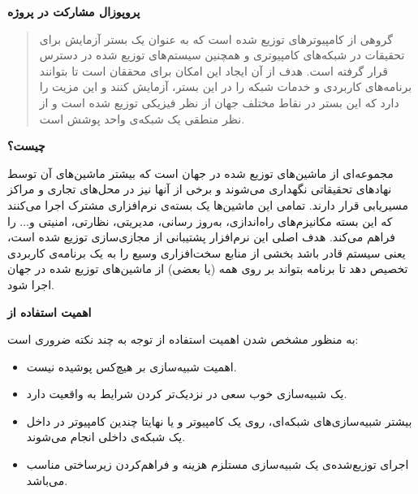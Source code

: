 \documentclass[11pt]{article}
\begin{document}
\thispagestyle{empty}

\bigskip
\bigskip

\centerline{\textbf{\Large{پروپوزال مشارکت در پروژه }}}

\bigskip
\bigskip



\bigskip


\bigskip 

\begin{abstract}
 گروهی از کامپیوتر‌های توزیع شده است که به عنوان یک بستر آزمایش برای تحقیقات در شبکه‌های کامپیوتری و همچنین سیستم‌های توزیع شده در دسترس قرار گرفته است. هدف از آن ایجاد این امکان برای محققان است تا بتوانند برنامه‌های کاربردی و خدمات شبکه را در این بستر، آزمایش کنند و این مزیت را دارد که این بستر در نقاط مختلف جهان از نظر فیزیکی توزیع شده است و از نظر منطقی یک شبکه‌ی واحد پوشش است.

\end{abstract}

\bigskip

\noindent\textbf{ چیست؟}

 مجموعه‌ای از ماشین‌های توزیع شده در جهان است که بیشتر ماشین‌های آن توسط نهادهای تحقیقاتی نگهداری می‌شوند و برخی از آنها نیز در محل‌های تجاری و مراکز مسیریابی قرار دارند. تمامی این ماشین‌ها یک بسته‌ی نرم‌افزاری مشترک اجرا می‌کنند که این بسته مکانیزم‌های راه‌اندازی، به‌روز رسانی، مدیریتی، نظارتی، امنیتی و... را فراهم می‌کند. هدف اصلی این نرم‌افزار پشتیبانی از مجازی‌سازی توزیع شده است، یعنی سیستم قادر باشد بخشی از منابع سخت‌افزاری وسیع  را به یک برنامه‌ی کاربردی تخصیص دهد تا برنامه بتواند بر روی همه (یا بعضی) از ماشین‌های توزیع شده در جهان اجرا شود.
\bigskip

\noindent\textbf{اهمیت استفاده از }

به منظور مشخص شدن اهمیت استفاده از  توجه به چند نکته ضروری است:
\begin{itemize}
	\item
	اهمیت شبیه‌سازی بر هیچ‌کس پوشیده نیست.
	\item
	یک شبیه‌سازی خوب سعی در نزدیک‌تر کردن شرایط به واقعیت دارد.
	\item
	بیشتر شبیه‌سازی‌های شبکه‌ای، روی یک کامپیوتر و یا نهایتا چندین کامپیوتر در داخل یک شبکه‌ی داخلی انجام می‌شوند.
	\item
	اجرای توزیع‌شده‌ی یک شبیه‌سازی مستلزم هزینه‌ و فراهم‌کردن زیرساختی مناسب می‌باشد.
\end{itemize}
\end{document}

